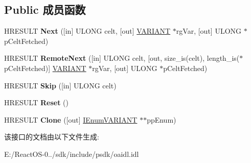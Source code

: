 \subsection*{Public 成员函数}
\begin{DoxyCompactItemize}
\item 
\mbox{\label{interface_i_enum_v_a_r_i_a_n_t_a7b85c3ce10e66f3f784a2e12980c2186}} 
H\+R\+E\+S\+U\+LT {\bfseries Next} (\mbox{[}in\mbox{]} U\+L\+O\+NG celt, \mbox{[}out\mbox{]} \hyperlink{structtag_v_a_r_i_a_n_t}{V\+A\+R\+I\+A\+NT} $\ast$rg\+Var, \mbox{[}out\mbox{]} U\+L\+O\+NG $\ast$p\+Celt\+Fetched)
\item 
\mbox{\label{interface_i_enum_v_a_r_i_a_n_t_ae66193f810f279dae863c8a92fb8ab41}} 
H\+R\+E\+S\+U\+LT {\bfseries Remote\+Next} (\mbox{[}in\mbox{]} U\+L\+O\+NG celt, \mbox{[}out, size\+\_\+is(celt), length\+\_\+is($\ast$p\+Celt\+Fetched)\mbox{]} \hyperlink{structtag_v_a_r_i_a_n_t}{V\+A\+R\+I\+A\+NT} $\ast$rg\+Var, \mbox{[}out\mbox{]} U\+L\+O\+NG $\ast$p\+Celt\+Fetched)
\item 
\mbox{\label{interface_i_enum_v_a_r_i_a_n_t_ad03901d11c6f4d9013054e2600727b59}} 
H\+R\+E\+S\+U\+LT {\bfseries Skip} (\mbox{[}in\mbox{]} U\+L\+O\+NG celt)
\item 
\mbox{\label{interface_i_enum_v_a_r_i_a_n_t_a92476a34325a79749932b6752802123c}} 
H\+R\+E\+S\+U\+LT {\bfseries Reset} ()
\item 
\mbox{\label{interface_i_enum_v_a_r_i_a_n_t_adfd452d27c0a65e885c3005736b31a15}} 
H\+R\+E\+S\+U\+LT {\bfseries Clone} (\mbox{[}out\mbox{]} \hyperlink{interface_i_enum_v_a_r_i_a_n_t}{I\+Enum\+V\+A\+R\+I\+A\+NT} $\ast$$\ast$pp\+Enum)
\end{DoxyCompactItemize}


该接口的文档由以下文件生成\+:\begin{DoxyCompactItemize}
\item 
E\+:/\+React\+O\+S-\/0../sdk/include/psdk/oaidl.\+idl\end{DoxyCompactItemize}
